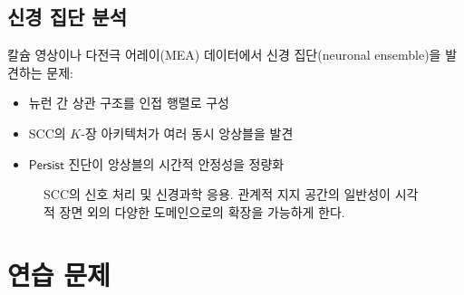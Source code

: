 \subsection{신경 집단 분석}

칼슘 영상이나 다전극 어레이(MEA) 데이터에서 신경 집단(neuronal ensemble)을 발견하는 문제:
\begin{itemize}
    \item 뉴런 간 상관 구조를 인접 행렬로 구성
    \item SCC의 $K$-장 아키텍처가 여러 동시 앙상블을 발견
    \item $\mathsf{Persist}$ 진단이 앙상블의 시간적 안정성을 정량화
\end{itemize}

\begin{figure}[t]
\centering
{}
\caption{SCC의 신호 처리 및 신경과학 응용. 관계적 지지 공간의 일반성이 시각적 장면 외의 다양한 도메인으로의 확장을 가능하게 한다.}
\label{fig:signal-neuro}
\end{figure}


\section{연습 문제}
\label{sec:ch14-exercises}

